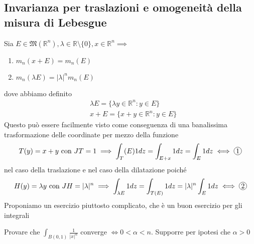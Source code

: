 \subsection{Invarianza per traslazioni e omogeneità della misura di Lebesgue}
Sia $E \in \mathfrak{M}(\mathbb{R}^n), \lambda \in \mathbb{R} \setminus \{0\}, x \in \mathbb{R}^n \implies$
\begin{enumerate}[label=\protect\circled{\arabic*}]
	\item $m_n(x+E) = m_n(E)$
	\item $m_n(\lambda E) = |\lambda|^n m_n(E)$
\end{enumerate}
dove abbiamo definito
\begin{align*}
&\lambda E = \{\lambda y \in \mathbb{R}^n : y \in E \} \\
&x + E = \{x+y \in \mathbb{R}^n : y \in E \}
\end{align*}
Questo può essere facilmente visto come conseguenza di una banalissima trasformazione delle coordinate per mezzo della funzione
$$
T(y) = x + y \text{ con } JT = 1 \implies \int_T(E) 1dz = \int_{E+x} 1dz = \int_E 1dz \iff \circled{1}
$$
nel caso della traslazione e nel caso della dilatazione poiché
$$
H(y) = \lambda y \text{ con } JH = |\lambda|^n \implies \int_{\lambda E} 1dz = \int_{T(E)} 1dz = |\lambda|^n \int_E 1dz \iff \circled{2}
$$
Proponiamo un esercizio piuttosto complicato, che è un buon esercizio per gli integrali
\begin{exercise}
Provare che $\int_{B(0, 1)} \frac{1}{|x|^\alpha}$ converge $\iff 0 < \alpha < n$. Supporre per ipotesi che $\alpha > 0$
\end{exercise}
